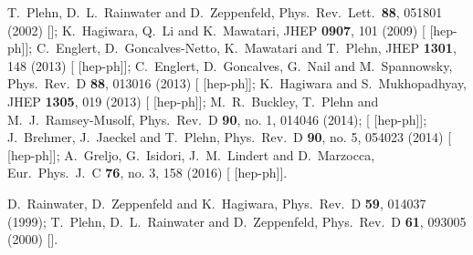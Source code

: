   T.~Plehn, D.~L.~Rainwater and D.~Zeppenfeld,
  Phys.\ Rev.\ Lett.\  {\bf 88}, 051801 (2002)
  [];
  K.~Hagiwara, Q.~Li and K.~Mawatari,
  JHEP {\bf 0907}, 101 (2009)
  [ [hep-ph]];
  C.~Englert, D.~Goncalves-Netto, K.~Mawatari and T.~Plehn,
  JHEP {\bf 1301}, 148 (2013)
  [ [hep-ph]];
  C.~Englert, D.~Goncalves, G.~Nail and M.~Spannowsky,
  Phys.\ Rev.\ D {\bf 88}, 013016 (2013)
  [ [hep-ph]];
  K.~Hagiwara and S.~Mukhopadhyay,
  JHEP {\bf 1305}, 019 (2013)
  [ [hep-ph]];
  M.~R.~Buckley, T.~Plehn and M.~J.~Ramsey-Musolf,
  Phys.\ Rev.\ D {\bf 90}, no. 1, 014046 (2014);
  [ [hep-ph]];
  J.~Brehmer, J.~Jaeckel and T.~Plehn,
  Phys.\ Rev.\ D {\bf 90}, no. 5, 054023 (2014)
  [ [hep-ph]];
  A.~Greljo, G.~Isidori, J.~M.~Lindert and D.~Marzocca,
  Eur.\ Phys.\ J.\ C {\bf 76}, no. 3, 158 (2016)
  [ [hep-ph]].

 D.~Rainwater, D.~Zeppenfeld and K.~Hagiwara,
  Phys.\ Rev.\ D {\bf 59}, 014037 (1999);
 T.~Plehn, D.~L.~Rainwater and D.~Zeppenfeld,
  Phys.\ Rev.\ D {\bf 61}, 093005 (2000)
  [].

